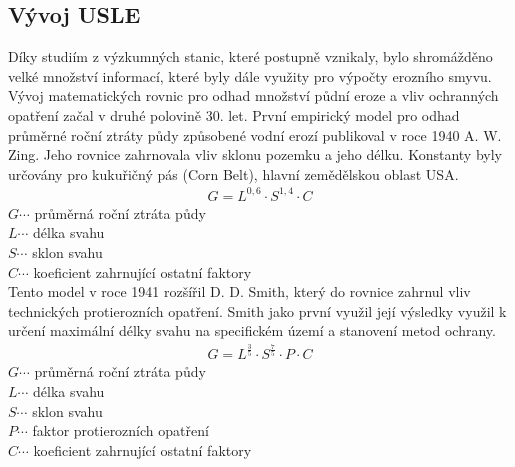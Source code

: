 \subsection{Vývoj USLE}
Díky studiím z výzkumných stanic, které postupně vznikaly, bylo shromážděno velké množství informací, které byly dále využity pro výpočty erozního smyvu. Vývoj matematických rovnic pro odhad množství půdní eroze a vliv ochranných opatření začal v druhé polovině 30. let. První empirický model pro odhad průměrné roční ztráty půdy způsobené vodní erozí publikoval v roce 1940 A. W. Zing. Jeho rovnice zahrnovala vliv sklonu pozemku a jeho délku. Konstanty byly určovány pro kukuřičný pás (Corn Belt), hlavní zemědělskou oblast USA.
\begin{align}
   \label{zing1940} G=L^{0,6}\cdot S^{1,4}\cdot C
\end{align}
\hspace*{2cm}$G \cdots$ průměrná roční ztráta půdy\\
\hspace*{2cm}$L \cdots$ délka svahu \\ 
\hspace*{2cm}$S \cdots$ sklon svahu \\ 
\hspace*{2cm}$C \cdots$ koeficient zahrnující ostatní faktory\\

Tento model v roce 1941 rozšířil D. D. Smith, který do rovnice zahrnul vliv technických protierozních opatření. Smith jako první využil její výsledky využil k určení maximální délky svahu na specifickém území a stanovení metod ochrany.
\begin{align}
   \label{smith1941} G=L^{\frac{3}{5}}\cdot S^{\frac{7}{5}}\cdot P\cdot C
\end{align}
\hspace*{2cm}$G \cdots$ průměrná roční ztráta půdy\\
\hspace*{2cm}$L \cdots$ délka svahu \\ 
\hspace*{2cm}$S \cdots$ sklon svahu \\ 
\hspace*{2cm}$P \cdots$ faktor protierozních opatření \\
\hspace*{2cm}$C \cdots$ koeficient zahrnující ostatní faktory \\

